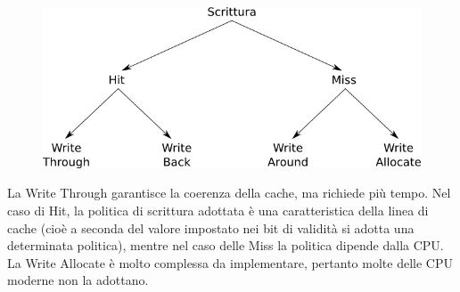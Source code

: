 \documentclass[11pt]{book}
\begin{document}
\begin{figure}[h]
  \centering
  \includegraphics[width=.6\textwidth]{images/alberocache.png}
\end{figure}

La Write Through garantisce la coerenza della cache, ma richiede pi\`u
tempo.  Nel caso di Hit, la politica di scrittura adottata \`e una
caratteristica della linea di cache (cio\`e a seconda del valore
impostato nei bit di validit\`a si adotta una determinata politica),
mentre nel caso delle Miss la politica dipende dalla CPU. La Write
Allocate \`e molto complessa da implementare, pertanto molte delle CPU
moderne non la adottano.
\end{document}
